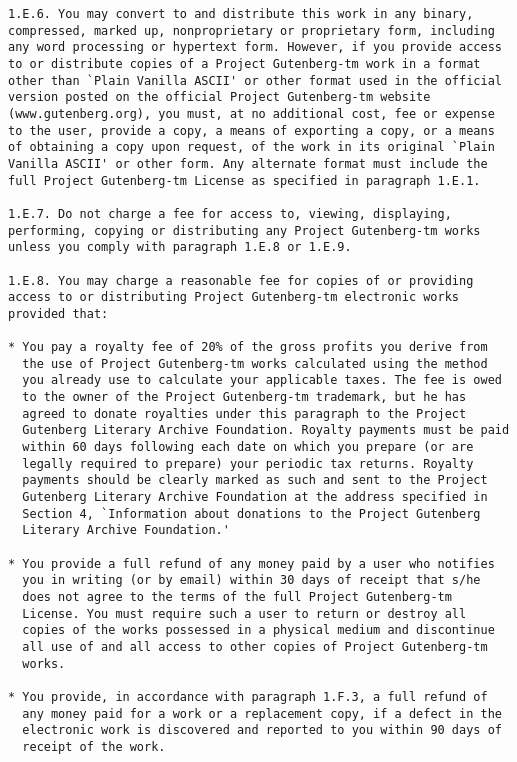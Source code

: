 \documentclass[oneside]{book}
\begin{document}
\begin{verbatim}
1.E.6. You may convert to and distribute this work in any binary,
compressed, marked up, nonproprietary or proprietary form, including
any word processing or hypertext form. However, if you provide access
to or distribute copies of a Project Gutenberg-tm work in a format
other than `Plain Vanilla ASCII' or other format used in the official
version posted on the official Project Gutenberg-tm website
(www.gutenberg.org), you must, at no additional cost, fee or expense
to the user, provide a copy, a means of exporting a copy, or a means
of obtaining a copy upon request, of the work in its original `Plain
Vanilla ASCII' or other form. Any alternate format must include the
full Project Gutenberg-tm License as specified in paragraph 1.E.1.

1.E.7. Do not charge a fee for access to, viewing, displaying,
performing, copying or distributing any Project Gutenberg-tm works
unless you comply with paragraph 1.E.8 or 1.E.9.

1.E.8. You may charge a reasonable fee for copies of or providing
access to or distributing Project Gutenberg-tm electronic works
provided that:

* You pay a royalty fee of 20% of the gross profits you derive from
  the use of Project Gutenberg-tm works calculated using the method
  you already use to calculate your applicable taxes. The fee is owed
  to the owner of the Project Gutenberg-tm trademark, but he has
  agreed to donate royalties under this paragraph to the Project
  Gutenberg Literary Archive Foundation. Royalty payments must be paid
  within 60 days following each date on which you prepare (or are
  legally required to prepare) your periodic tax returns. Royalty
  payments should be clearly marked as such and sent to the Project
  Gutenberg Literary Archive Foundation at the address specified in
  Section 4, `Information about donations to the Project Gutenberg
  Literary Archive Foundation.'

* You provide a full refund of any money paid by a user who notifies
  you in writing (or by email) within 30 days of receipt that s/he
  does not agree to the terms of the full Project Gutenberg-tm
  License. You must require such a user to return or destroy all
  copies of the works possessed in a physical medium and discontinue
  all use of and all access to other copies of Project Gutenberg-tm
  works.

* You provide, in accordance with paragraph 1.F.3, a full refund of
  any money paid for a work or a replacement copy, if a defect in the
  electronic work is discovered and reported to you within 90 days of
  receipt of the work.


\end{verbatim}
\end{document}
